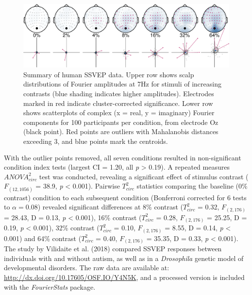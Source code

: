 \documentclass[]{article}
\begin{document}
\begin{figure}

{\centering \includegraphics{manuscript_files/figure-latex/humanSSVEP-1} 

}

\caption{Summary of human SSVEP data. Upper row shows scalp distributions of Fourier amplitudes at 7Hz for stimuli of increasing contrasts (blue shading indicates higher amplitudes). Electrodes marked in red indicate cluster-corrected significance.  Lower row shows scatterplots of complex (x = real, y = imaginary) Fourier components for 100 participants per condition, from electrode Oz (black point). Red points are outliers with Mahalanobis distances exceeding 3, and blue points mark the centroids.}\label{fig:humanSSVEP}
\end{figure}

With the outlier points removed, all seven conditions resulted in non-significant condition index tests (largest CI = 1.20, all \emph{p} \textgreater{} 0.19). A repeated measures \(ANOVA^2_{circ}\) test was conducted, revealing a significant effect of stimulus contrast (\(F_{(12,1056)}\) = 38.9, \emph{p} \textless{} 0.001). Pairwise \(T^2_{circ}\) statistics comparing the baseline (0\% contrast) condition to each subsequent condition (Bonferroni corrected for 6 tests to \(\alpha = 0.08\)) revealed significant differences at 8\% contrast (\(T^2_{circ}\) = 0.32, \(F_{(2,176)}\) = 28.43, D = 0.13, \emph{p} \textless{} 0.001), 16\% contrast (\(T^2_{circ}\) = 0.28, \(F_{(2,176)}\) = 25.25, D = 0.19, \emph{p} \textless{} 0.001), 32\% contrast (\(T^2_{circ}\) = 0.10, \(F_{(2,176)}\) = 8.55, D = 0.14, \emph{p} \textless{} 0.001) and 64\% contrast (\(T^2_{circ}\) = 0.40, \(F_{(2,176)}\) = 35.35, D = 0.33, \emph{p} \textless{} 0.001). The study by Vilidaite et al. (2018) compared SSVEP responses between individuals with and without autism, as well as in a \emph{Drosophila} genetic model of developmental disorders. The raw data are available at: \url{http://dx.doi.org/10.17605/OSF.IO/Y4N5K}, and a processed version is included with the \emph{FourierStats} package.
\end{document}
